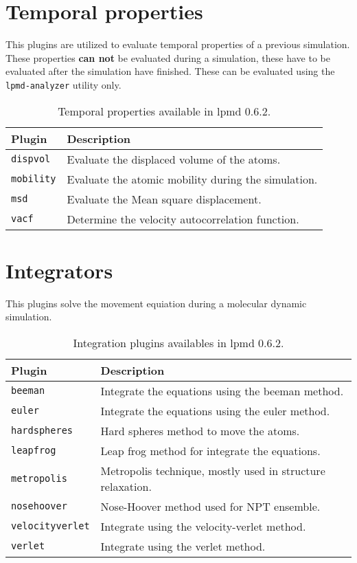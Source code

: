 \section{Temporal properties}
This plugins are utilized to evaluate temporal properties of a previous
simulation. These properties \textbf{can not} be evaluated during a simulation,
these have to be evaluated after the simulation have finished. These can be
evaluated using the \verb|lpmd-analyzer| utility only.

\begin{table}[h!]\centering
 \begin{tabular}{|l|p{13cm}|}\hline
 Plugin & Description \\
 \hline
 \texttt{dispvol} & Evaluate the displaced volume of the atoms.\\
 \hline
 \texttt{mobility} & Evaluate the atomic mobility during the simulation.\\
 \hline
 \texttt{msd} & Evaluate the Mean square displacement.\\
 \hline
 \texttt{vacf} & Determine the velocity autocorrelation function.\\
 \hline
 \end{tabular}
\label{tab:modtempproper}
\caption{Temporal properties available in lpmd 0.6.2.}
\end{table}

\section{Integrators}
This plugins solve the movement equiation during a molecular dynamic simulation.

\begin{table}[h!]\centering
 \begin{tabular}{|l|p{13cm}|}\hline
 Plugin & Description \\
 \hline\hline
 \texttt{beeman} & Integrate the equations using the beeman method.\\
 \hline
 \texttt{euler} & Integrate the equations using the euler method.\\
 \hline
 \texttt{hardspheres} & Hard spheres method to move the atoms.\\
 \hline
 \texttt{leapfrog} & Leap frog method for integrate the equations.\\
 \hline
 \texttt{metropolis} & Metropolis technique, mostly used in structure
 relaxation.\\
 \hline
 \texttt{nosehoover} & Nose-Hoover method used for NPT ensemble.\\
 \hline
 \texttt{velocityverlet} & Integrate using the velocity-verlet method.\\
 \hline
 \texttt{verlet} & Integrate using the verlet method.\\
 \hline
 \end{tabular}
\label{tab:modinteg}
\caption{Integration plugins availables in lpmd 0.6.2.}
\end{table}

